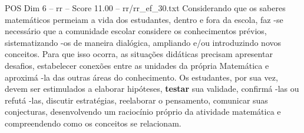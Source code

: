 \begin{textsample}{POS Dim 6 – rr – Score 11.00 – rr/rr\_ef\_30.txt}
Considerando que os saberes matemáticos permeiam a vida dos estudantes, dentro e fora da escola, faz -se necessário que a comunidade escolar considere os conhecimentos prévios, sistematizando -os de maneira dialógica, ampliando e/ou introduzindo novos conceitos.
Para que isso ocorra, as situações didáticas precisam apresentar desafios, estabelecer conexões entre as unidades da própria Matemática e aproximá -la das outras áreas do conhecimento.
Os estudantes, por sua vez, devem ser estimulados a elaborar hipóteses, \textbf{testar} sua validade, confirmá -las ou refutá -las, discutir estratégias, reelaborar o pensamento, comunicar suas conjecturas, desenvolvendo um raciocínio próprio da atividade matemática e compreendendo como os conceitos se relacionam.

\end{textsample}

